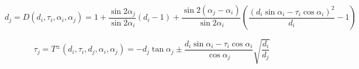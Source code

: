 \documentclass[a4paper]{article}
\begin{document}
\begin{equation} 
 \label{GrindEQ__24_}
{d_j} =D\left(d_{i} ,\tau _{i} ,\alpha _{i} ,\alpha _{j}\right)= 1 + \frac{{\sin 2{\alpha _j}}}{{\sin 2{\alpha _i}}}\left( {{d_i} - 1} \right) + \frac{{\sin 2\left( {{\alpha _j} - {\alpha _i}} \right)}}{{\sin 2{\alpha _i}}}\left( {\frac{{{{\left( {d_i\sin {\alpha _i} - {\tau _i}\cos {\alpha _i}} \right)}^2}}}{{{d_i}}} - 1} \right) 
\end{equation}

\begin{equation} 
 \label{GrindEQ__25_} {\tau _j} = T^{\pm }\left(d_{i} ,\tau _{i} ,d_{j},\alpha_i,\alpha_j \right)= - {d_j}\tan {\alpha _j} \pm \frac{{{d_i}\sin {\alpha _i} - {\tau _i}\cos {\alpha _i}}}{{\cos {\alpha _j}}}\sqrt {\frac{{{d_i}}}{{{d_j}}}}
\end{equation}


%
 
\end{document}
